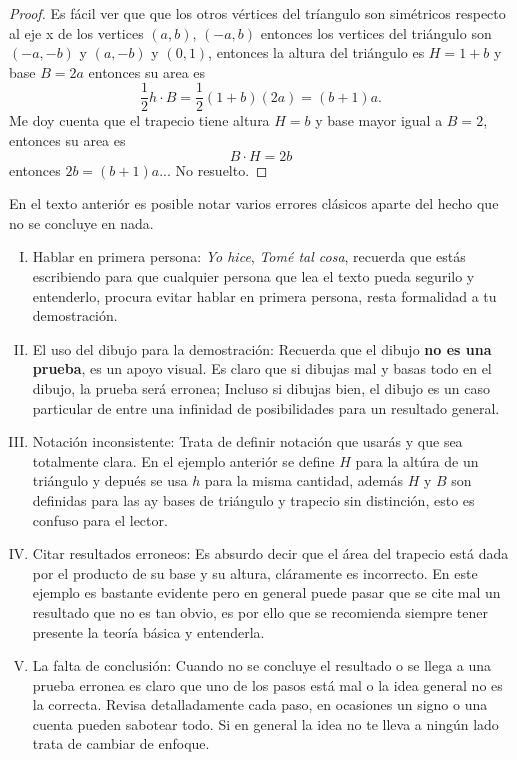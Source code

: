 \documentclass[10pt]{article}
\begin{document}
\begin{itemize}
\begin{proof}
Es fácil ver que que los otros vértices del tríangulo son simétricos respecto al eje x de los vertices $(a,b)$, $(-a,b)$ entonces los vertices del triángulo son  $(-a,-b)$ y $(a,-b)$ y $(0,1)$, entonces la altura del triángulo es $H=1+b$ y base $B=2a$ entonces su area es 
$$\frac{1}{2}h \cdot B =\frac{1}{2}(1+b)(2a)=(b+1)a.$$
Me doy cuenta que el trapecio tiene altura $H=b$ y base mayor igual a $B=2$, entonces su area es 
$$B \cdot H = 2b$$
entonces $2b = (b+1)a $... No resuelto.
\end{proof}
En el texto anteriór es posible notar varios errores clásicos aparte del hecho que no se concluye en nada. 

\begin{enumerate}[I)]
\item Hablar en primera persona: \textit{Yo hice}, \textit{Tomé tal cosa}, recuerda que estás escribiendo para que cualquier persona que lea el texto pueda segurilo y entenderlo, procura evitar hablar en primera persona, resta formalidad a tu demostración.

\item El uso del dibujo para la demostración: Recuerda que el dibujo \textbf{no es una prueba}, es un apoyo visual. Es claro que si dibujas mal y basas todo en el dibujo, la prueba será erronea;  Incluso si dibujas bien, el dibujo es un caso particular de entre una infinidad de posibilidades para un resultado general. 

\item Notación inconsistente: Trata de definir notación que usarás y que sea totalmente clara. En el ejemplo anteriór se define $H$ para la altúra de un triángulo y depués se usa $h$ para la misma cantidad, además $H$ y $B$ son definidas para las ay bases de triángulo y trapecio sin distinción, esto es confuso para el lector.

\item Citar resultados erroneos: Es absurdo decir que el área del trapecio está dada por el producto de su base y su altura, cláramente es incorrecto. En este ejemplo es bastante evidente pero en general puede pasar que se cite mal un resultado que no es tan obvio, es por ello que se recomienda siempre tener presente la teoría básica y entenderla.

\item La falta de conclusión: Cuando no se concluye el resultado o se llega a una prueba erronea es claro que uno de los pasos está mal o la idea general no es la correcta. Revisa detalladamente cada paso, en ocasiones un signo o una cuenta pueden sabotear todo. Si en general la idea no te lleva a ningún lado trata de cambiar de enfoque.


\end{enumerate}
\end{itemize}
\end{document}
